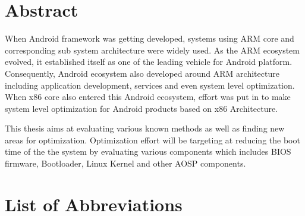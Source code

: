 \documentclass{mainreport}
\begin{document}
\chapter*{Abstract}\label{Abstract}

{
\label{Abstract}



\hspace{6mm} When Android framework was getting developed, systems using ARM core and
corresponding sub system architecture were widely used. As the ARM ecosystem evolved,
it established itself as one of the leading vehicle for Android platform. Consequently,
Android ecosystem also developed around ARM architecture including application
development, services and even system level optimization. When x86 core also entered
this Android ecosystem, effort was put in to make system level optimization for
Android products based on x86 Architecture.

This thesis aims at evaluating various known methods as well as finding new areas
for optimization. Optimization effort will be targeting at reducing the boot time of
the the system by evaluating various components which includes BIOS firmware,
Bootloader, Linux Kernel and other AOSP components.
}

\tableofcontents


%

%

\listoffigures
{}
{}


\chapter*{List of Abbreviations}\label{abbrv}
\end{document}
